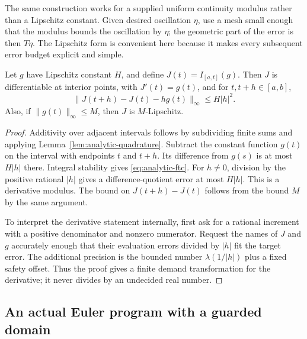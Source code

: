 The same construction works for a supplied uniform continuity modulus rather than a Lipschitz constant.  Given desired oscillation $\eta$, use a mesh small enough that the modulus bounds the oscillation by $\eta$; the geometric part of the error is then $T\eta$.  The Lipschitz form is convenient here because it makes every subsequent error budget explicit and simple.

\begin{proposition}
\label{prop:analytic-ftc}
Let $g$ have Lipschitz constant $H$, and define $J(t)=I_{[a,t]}(g)$.  Then $J$ is differentiable at interior points, with $J'(t)=g(t)$, and for $t,t+h\in[a,b]$,
\begin{equation}
 \|J(t+h)-J(t)-h g(t)\|_\infty\le H|h|^2.\label{eq:analytic-ftc}
\end{equation}
Also, if $\|g(t)\|_\infty\le M$, then $J$ is $M$-Lipschitz.
\end{proposition}

\begin{proof}
Additivity over adjacent intervals follows by subdividing finite sums and applying Lemma~\ref{lem:analytic-quadrature}.  Subtract the constant function $g(t)$ on the interval with endpoints $t$ and $t+h$.  Its difference from $g(s)$ is at most $H|h|$ there.  Integral stability gives \eqref{eq:analytic-ftc}.  For $h\ne0$, division by the positive rational $|h|$ gives a difference-quotient error at most $H|h|$.  This is a derivative modulus.  The bound on $J(t+h)-J(t)$ follows from the bound $M$ by the same argument.

To interpret the derivative statement internally, first ask for a rational increment with a positive denominator and nonzero numerator.  Request the names of $J$ and $g$ accurately enough that their evaluation errors divided by $|h|$ fit the target error.  The additional precision is the bounded number $\lambda(1/|h|)$ plus a fixed safety offset.  Thus the proof gives a finite demand transformation for the derivative; it never divides by an undecided real number.
\end{proof}

\subsection{An actual Euler program with a guarded domain}

